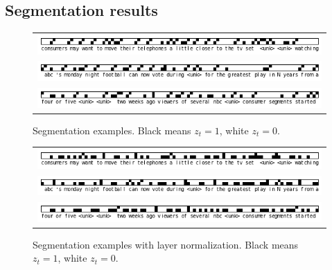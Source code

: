 


\subsection{Segmentation results}

\begin{figure}[ht]
\centering
\begin{tabular}{c}
\includegraphics[scale=0.75]{chapters/COLING/schedule} \\
\includegraphics[scale=0.75]{chapters/COLING/schedule2} \\
\includegraphics[scale=0.75]{chapters/COLING/schedule3}
\end{tabular}
\caption{Segmentation examples. Black means $z_t=1$, white $z_t=0$.}
\label{fig:nolay}
\end{figure}

\begin{figure}[ht]
\centering
\begin{tabular}{c}
\includegraphics[scale=0.75]{chapters/COLING/layernorm} \\
\includegraphics[scale=0.75]{chapters/COLING/layernorm2} \\
\includegraphics[scale=0.75]{chapters/COLING/layernorm3}
\end{tabular}
\caption{Segmentation examples with layer normalization. Black means $z_t=1$, white $z_t=0$.}
\label{fig:lay}
\end{figure}

